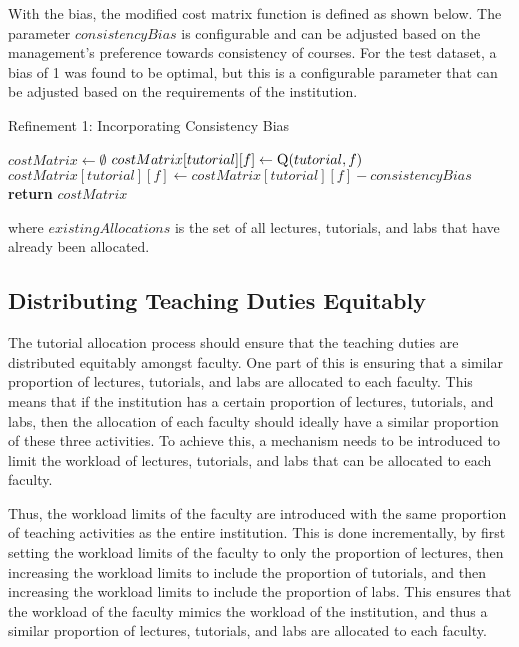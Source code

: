 With the bias, the modified cost matrix function is defined as shown below. The parameter $consistencyBias$ is configurable and can be adjusted based on the management's preference towards consistency of courses. For the test dataset, a bias of 1 was found to be optimal, but this is a configurable parameter that can be adjusted based on the requirements of the institution.

\begin{algorithm}[H]
  \caption*{Refinement 1: Incorporating Consistency Bias}
  \begin{algorithmic}
    \State $costMatrix \gets \emptyset$
    \State $costMatrix[tutorial][f] \gets \Call{Q}{tutorial, f}$
    \State $costMatrix[tutorial][f] \gets costMatrix[tutorial][f] - consistencyBias$
    \EndIf
    \EndFor
    \EndFor
    \State \textbf{return} $costMatrix$
    \EndProcedure
  \end{algorithmic}
\end{algorithm}

where $existingAllocations$ is the set of all lectures, tutorials, and labs that have already been allocated.

\subsection{Distributing Teaching Duties Equitably}
\label{sec:workload_limits}

The tutorial allocation process should ensure that the teaching duties are distributed equitably amongst faculty. One part of this is ensuring that a similar proportion of lectures, tutorials, and labs are allocated to each faculty. This means that if the institution has a certain proportion of lectures, tutorials, and labs, then the allocation of each faculty should ideally have a similar proportion of these three activities. To achieve this, a mechanism needs to be introduced to limit the workload of lectures, tutorials, and labs that can be allocated to each faculty.

Thus, the workload limits of the faculty are introduced with the same proportion of teaching activities as the entire institution. This is done incrementally, by first setting the workload limits of the faculty to only the proportion of lectures, then increasing the workload limits to include the proportion of tutorials, and then increasing the workload limits to include the proportion of labs. This ensures that the workload of the faculty mimics the workload of the institution, and thus a similar proportion of lectures, tutorials, and labs are allocated to each faculty.

